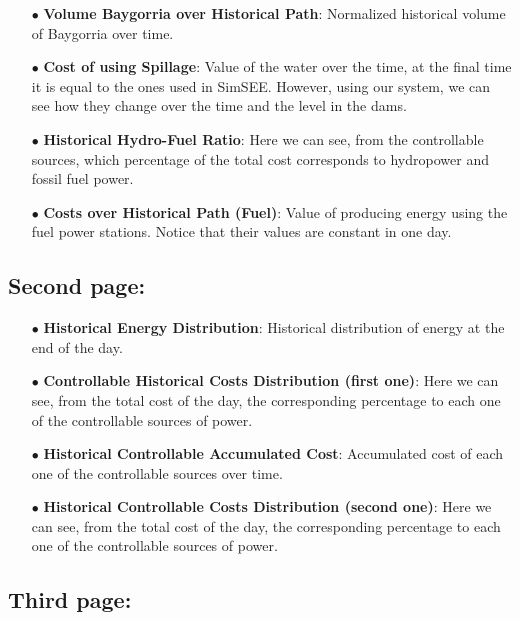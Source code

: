 \documentclass[12pt]{article}
\theoremstyle{definition}
\theoremstyle{remark}
\begin{document}
\begin{enumerate}
\item[$\bullet$] \textbf{Volume Baygorria over Historical Path}: Normalized historical volume of Baygorria over time.

\item[$\bullet$] \textbf{Cost of using Spillage}: Value of the water over the time, at the final time it is equal to the ones used in SimSEE. However, using our system, we can see how they change over the time and the level in the dams.

\item[$\bullet$] \textbf{Historical Hydro-Fuel Ratio}: Here we can see, from the controllable sources, which percentage of the total cost corresponds to hydropower and fossil fuel power.

\item[$\bullet$] \textbf{Costs over Historical Path (Fuel)}: Value of producing energy using the fuel power stations. Notice that their values are constant in one day.

\end{enumerate}

\subsection*{Second page:}

\begin{enumerate}

\item[$\bullet$] \textbf{Historical Energy Distribution}: Historical distribution of energy at the end of the day.

\item[$\bullet$] \textbf{Controllable Historical Costs Distribution (first one)}: Here we can see, from the total cost of the day, the corresponding percentage to each one of the controllable sources of power.

\item[$\bullet$] \textbf{Historical Controllable Accumulated Cost}: Accumulated cost of each one of the controllable sources over time.

\item[$\bullet$] \textbf{Historical Controllable Costs Distribution (second one)}: Here we can see, from the total cost of the day, the corresponding percentage to each one of the controllable sources of power.

\end{enumerate}

\subsection*{Third page:}
\end{document}
